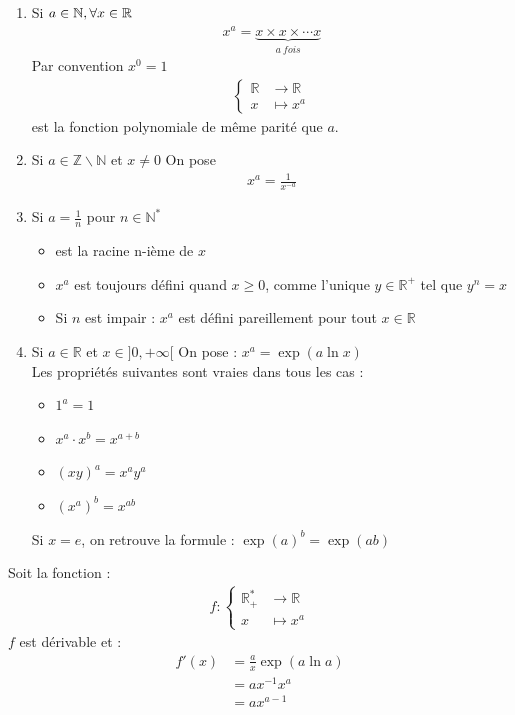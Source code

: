 \begin{enumerate}
	\item Si $a \in \mathbb{N}, \forall x \in \mathbb{R}$
	\begin{align*}
		x^a = \underbrace{x \times x \times \cdots x}_{a \ fois}
	\end{align*}
	Par convention $x^0 = 1$
	\begin{align*}
		\begin{cases}
			\mathbb{R} &\to \mathbb{R} \\
			x &\mapsto x^a 
		\end{cases}
	\end{align*}
	est la fonction polynomiale de même parité que $a$.
	\item Si $a \in \mathbb{Z} \backslash \mathbb{N}$ et $x \neq 0$
	On pose 
	\begin{align*}
		x^a = \frac{1}{x^{-a}}
	\end{align*}
	\item Si $a = \frac{1}{n}$ pour $n \in \mathbb{N}^*$
	\begin{itemize}
		\item est la racine n-ième de $x$
		\item  $x^a$ est toujours défini quand $x \geqslant 0$, comme l'unique $y \in \mathbb{R}^+$ tel que $y^n = x$
		\item Si $n$ est impair : $x^a$ est défini pareillement pour tout $x \in \mathbb{R}$
	\end{itemize}
	\item Si $a \in \mathbb{R}$ et $x \in ]0, +\infty[$
	On pose : $x^a = \exp{(a \ln{x})}$ \\
	Les propriétés suivantes sont vraies dans tous les cas : 
	\begin{itemize}
		\item $1^a = 1$
		\item $x^a \cdot x^b = x^{a+b}$
		\item $(xy)^a = x^a y^a$
		\item $(x^a)^b = x^{ab}$
	\end{itemize}
	Si $x = e$, on retrouve la formule : $\exp{(a)}^b = \exp{(ab)}$
\end{enumerate}

\begin{graybox}
	\begin{proposition}
		Soit la fonction :
		\begin{align*}
			f :
			\begin{cases}
				\mathbb{R}^*_+ &\to \mathbb{R} \\
				x &\mapsto x^a
			\end{cases}
		\end{align*}
		$f$ est dérivable et :
		\begin{align*}
			f'(x) &= \frac{a}{x} \exp{(a\ln{a})}  \\
			&= a x^{-1}x^a  \\
			&= a x^{a - 1}
		\end{align*}    
	\end{proposition}
\end{graybox}

